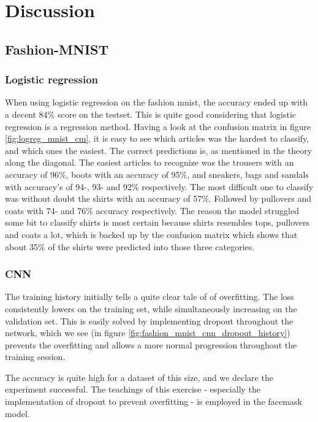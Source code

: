\documentclass[../main.tex]{subfiles}
\begin{document}
\section{Discussion}

\subsection{Fashion-MNIST}
\subsubsection{Logistic regression}
When using logistic regression on the fashion mnist, the accuracy ended up with a decent 84\% score on the testset. This is quite good considering that logistic regression is a regression method. Having a look at the confusion matrix in figure \ref{fig:logreg_mnist_cm}, it is easy to see which articles was the hardest to classify, and which ones the easiest. The correct predictions is, as mentioned in the theory along the diagonal. The easiest articles to recognize was the trousers with an accuracy of 96\%, boots with an accuracy of 95\%, and sneakers, bags and sandals with accuracy's of 94-, 93- and 92\% respectively. The most difficult one to classify was without doubt the shirts with an accuracy of 57\%. Followed by pullovers and coats with 74- and 76\% accuracy respectively. The reason the model struggled some bit to classify shirts is most certain because shirts resembles tops, pullovers and coats a lot, which is backed up by the confusion matrix which shows that about 35\% of the shirts were predicted into those three categories.

\subsubsection{CNN}
The training history initially tells a quite clear tale of of overfitting. The loss consistently lowers on the training set, while simultaneously increasing on the validation set. This is easily solved by implementing dropout throughout the network, which we see (in figure \ref{fig:fashion_mnist_cnn_dropout_history}) prevents the overfitting and allows a more normal progression throughout the training session.

The accuracy is quite high for a dataset of this size, and we declare the experiment successful. The teachings of this exercise - especially the implementation of dropout to prevent overfitting - is employed in the facemask model.
\end{document}
